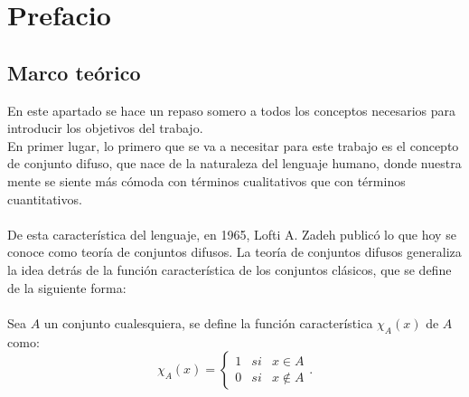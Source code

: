 \chapter{Prefacio}

\section{Marco teórico}
En este apartado se hace un repaso somero a todos los conceptos necesarios para introducir los objetivos del trabajo. \\
En primer lugar, lo primero que se va a necesitar para este trabajo es el concepto de conjunto difuso, que nace de la  naturaleza del lenguaje humano, donde nuestra mente se siente más cómoda con términos cualitativos que con términos cuantitativos.\\ \\
De esta característica del lenguaje, en 1965, Lofti A. Zadeh publicó lo que hoy se conoce como teoría de conjuntos difusos. La teoría de conjuntos difusos generaliza la idea detrás de la función característica de los conjuntos clásicos, que se define de la siguiente forma: \\ \\
Sea $A$ un conjunto cualesquiera, se define la función característica $\chi_A(x)$ de $A$ como:
\[
	\chi_A(x) = \left\{
		\begin{array}{ccc}
			1 & si & x \in A \\
			0 & si & x \notin A
		\end{array}
	\right. .
\]

